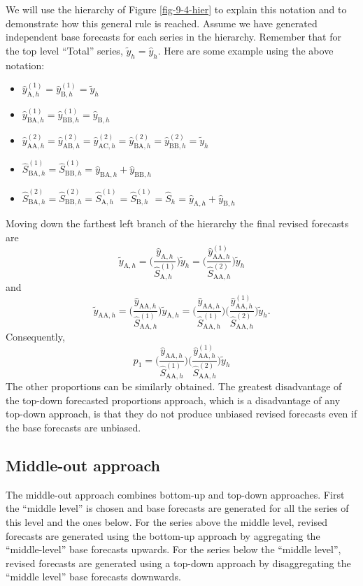\documentclass[nojss]{jss}
\def\yhat#1#2{\hat{y}_{\text{#1},#2}}
\def\ytilde#1#2{\tilde{y}_{\text{#1},#2}}
\def\Shat#1#2#3{\hat{S}_{\text{#1},#2}^{(#3)}}
\begin{document}
We will use the hierarchy of Figure \ref{fig-9-4-hier} to explain this notation and to demonstrate how this general rule is reached. Assume we have generated independent base forecasts for each series in the hierarchy. Remember that for the top level ``Total'' series, $\tilde{y}_{h}=\hat{y}_{h}$. Here are some example using the above notation:
\begin{itemize}
  \item $\hat{y}_{\text{A},h}^{(1)}=\hat{y}_{\text{B},h}^{(1)}= \tilde{y}_{h}$
  \item $\hat{y}_{\text{BA},h}^{(1)}=\hat{y}_{\text{BB},h}^{(1)}= \hat{y}_{\text{B},h}$
  \item $\hat{y}_{\text{AA},h}^{(2)}=\hat{y}_{\text{AB},h}^{(2)}= \hat{y}_{\text{AC},h}^{(2)}=\hat{y}_{\text{BA},h}^{(2)}= \hat{y}_{\text{BB},h}^{(2)}= \tilde{y}_{h}$
  \item $\Shat{BA}{h}{1} = \Shat{BB}{h}{1}= \yhat{BA}{h}+\yhat{BB}{h}$
  \item $\Shat{BA}{h}{2} = \Shat{BB}{h}{2}= \Shat{A}{h}{1} = \Shat{B}{h}{1}= \hat{S}_{h}= \yhat{A}{h}+\yhat{B}{h}$
\end{itemize}
Moving down the farthest left branch of the hierarchy the final revised forecasts are
$$
  \ytilde{A}{h} = \Bigg(\frac{\yhat{A}{h}}{\Shat{A}{h}{1}}\Bigg) \tilde{y}_{h} =
  \Bigg(\frac{\yhat{AA}{h}^{(1)}}{\Shat{AA}{h}{2}}\Bigg) \tilde{y}_{h}
$$
and
$$
  \ytilde{AA}{h} = \Bigg(\frac{\yhat{AA}{h}}{\Shat{AA}{h}{1}}\Bigg) \ytilde{A}{h}
=\Bigg(\frac{\yhat{AA}{h}}{\Shat{AA}{h}{1}}\Bigg) \Bigg(\frac{\yhat{AA}{h}^{(1)}}{\Shat{AA}{h}{2}}\Bigg)\tilde{y}_{h}.
$$
Consequently,
\[
  p_1=\Bigg(\frac{\yhat{AA}{h}}{\Shat{AA}{h}{1}}\Bigg) \Bigg(\frac{\yhat{AA}{h}^{(1)}}{\Shat{AA}{h}{2}}\Bigg)\tilde{y}_{h}
\]
The other proportions can be similarly obtained. The greatest disadvantage of the top-down forecasted proportions approach, which is a disadvantage of any top-down approach, is that they do not produce unbiased revised forecasts even if the base forecasts are unbiased.

\subsection*{Middle-out approach}

The middle-out approach combines bottom-up and top-down approaches. First the ``middle level'' is chosen and base forecasts are generated for all the series of this level and the ones below. For the series above the middle level, revised forecasts are generated using the bottom-up approach by aggregating the ``middle-level'' base forecasts upwards. For the series below the ``middle level'', revised forecasts are generated using a top-down approach by disaggregating the ``middle level'' base forecasts downwards.
\end{document}
